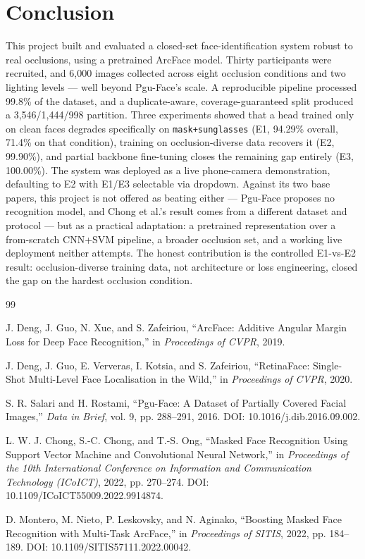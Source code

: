 \documentclass[11pt]{article}
\begin{document}
\section{Conclusion}

This project built and evaluated a closed-set face-identification system robust to real occlusions, using a pretrained ArcFace model. Thirty participants were recruited, and 6{,}000 images collected across eight occlusion conditions and two lighting levels — well beyond Pgu-Face's scale. A reproducible pipeline processed 99.8\% of the dataset, and a duplicate-aware, coverage-guaranteed split produced a 3{,}546/1{,}444/998 partition. Three experiments showed that a head trained only on clean faces degrades specifically on \texttt{mask+sunglasses} (E1, 94.29\% overall, 71.4\% on that condition), training on occlusion-diverse data recovers it (E2, 99.90\%), and partial backbone fine-tuning closes the remaining gap entirely (E3, 100.00\%). The system was deployed as a live phone-camera demonstration, defaulting to E2 with E1/E3 selectable via dropdown. Against its two base papers, this project is not offered as beating either — Pgu-Face proposes no recognition model, and Chong et al.'s result comes from a different dataset and protocol — but as a practical adaptation: a pretrained representation over a from-scratch CNN+SVM pipeline, a broader occlusion set, and a working live deployment neither attempts. The honest contribution is the controlled E1-vs-E2 result: occlusion-diverse training data, not architecture or loss engineering, closed the gap on the hardest occlusion condition.

\begin{thebibliography}{99}

 J. Deng, J. Guo, N. Xue, and S. Zafeiriou, ``ArcFace: Additive Angular Margin Loss for Deep Face Recognition,'' in \emph{Proceedings of CVPR}, 2019.

 J. Deng, J. Guo, E. Ververas, I. Kotsia, and S. Zafeiriou, ``RetinaFace: Single-Shot Multi-Level Face Localisation in the Wild,'' in \emph{Proceedings of CVPR}, 2020.

 S. R. Salari and H. Rostami, ``Pgu-Face: A Dataset of Partially Covered Facial Images,'' \emph{Data in Brief}, vol. 9, pp. 288--291, 2016. DOI: 10.1016/j.dib.2016.09.002.

 L. W. J. Chong, S.-C. Chong, and T.-S. Ong, ``Masked Face Recognition Using Support Vector Machine and Convolutional Neural Network,'' in \emph{Proceedings of the 10th International Conference on Information and Communication Technology (ICoICT)}, 2022, pp. 270--274. DOI: 10.1109/ICoICT55009.2022.9914874.

 D. Montero, M. Nieto, P. Leskovsky, and N. Aginako, ``Boosting Masked Face Recognition with Multi-Task ArcFace,'' in \emph{Proceedings of SITIS}, 2022, pp. 184--189. DOI: 10.1109/SITIS57111.2022.00042.

\end{thebibliography}
\end{document}
